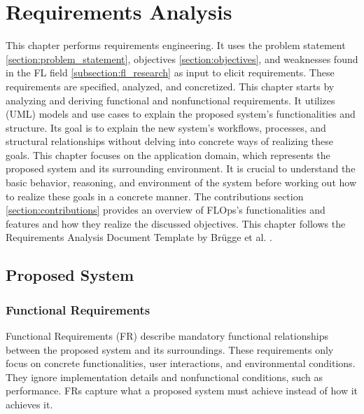 \chapter{Requirements Analysis}

This chapter performs requirements engineering.
It uses the problem statement \ref{section:problem_statement}, objectives \ref{section:objectives}, and weaknesses found in the FL field \ref{subsection:fl_research} as input to elicit requirements.
These requirements are specified, analyzed, and concretized. 
This chapter starts by analyzing and deriving functional and nonfunctional requirements.
It utilizes (UML) models and use cases to explain the proposed system's functionalities and structure.
Its goal is to explain the new system's workflows, processes, and structural relationships without delving into concrete ways of realizing these goals.
This chapter focuses on the application domain, which represents the proposed system and its surrounding environment.
It is crucial to understand the basic behavior, reasoning, and environment of the system before working out how to realize these goals in a concrete manner.
The contributions section \ref{section:contributions} provides an overview of FLOps's functionalities and features and how they realize the discussed objectives.
This chapter follows the Requirements Analysis Document Template by Brügge et al. \cite{book:bruegge}.

\section{Proposed System}

\subsection{Functional Requirements}
Functional Requirements (FR) describe mandatory functional relationships between the proposed system and its surroundings.
These requirements only focus on concrete functionalities, user interactions, and environmental conditions.
They ignore implementation details and nonfunctional conditions, such as performance.
FRs capture what a proposed system must achieve instead of how it achieves it. \cite{book:bruegge}


